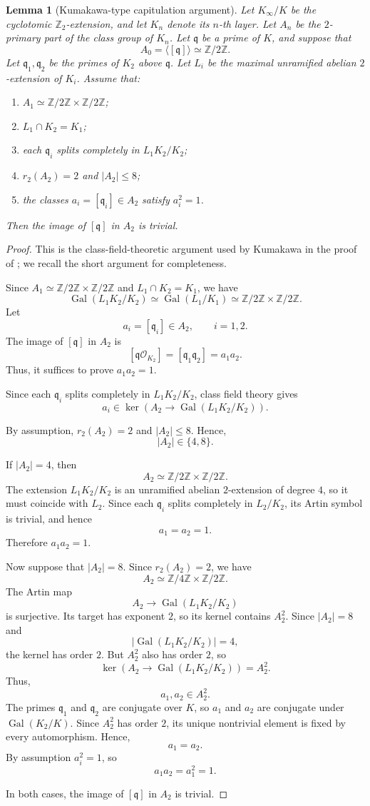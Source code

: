 \documentclass{article}
\numberwithin{equation}{section}
\theoremstyle{plain}  %
\newtheorem{lemma}{Lemma}[section]
\theoremstyle{definition}
\newcommand{\Z}{\mathbb{Z}}
\DeclareMathOperator{\Gal}{Gal}
\newcommand{\fk}{\mathfrak }
\begin{document}
\begin{lemma}[Kumakawa-type capitulation argument]
\label{lem:kumakawa-capitulation}
Let $K_\infty/K$ be the cyclotomic $\Z_2$-extension, and let
$K_n$ denote its $n$-th layer. Let $A_n$ be the $2$-primary part of
the class group of $K_n$. Let $\fk q$ be a prime of $K$, and
suppose that
$$
A_0=\langle[\fk q]\rangle\simeq \Z/2\Z.
$$
Let $\fk q_1,\fk q_2$ be the primes of $K_2$ above
$\fk q$. Let $L_i$ be the maximal unramified abelian
$2$-extension of $K_i$. Assume that:
\begin{enumerate}
    \item $A_1\simeq \Z/2\Z\times \Z/2\Z$;
    \item $L_1\cap K_2=K_1$;
    \item each $\fk q_i$ splits completely in $L_1K_2/K_2$;
    \item $r_2(A_2)=2$ and $|A_2|\le 8$;
    \item the classes $a_i=[\fk q_i]\in A_2$ satisfy $a_i^2=1$.
\end{enumerate}
Then the image of $[\fk q]$ in $A_2$ is trivial.
\end{lemma}

\begin{proof}
This is the class-field-theoretic argument used by Kumakawa in the proof of
\cite[Theorem~2.1.5]{MR4262274}; we recall the short argument for completeness.

Since $A_1\simeq \Z/2\Z\times \Z/2\Z$ and $L_1\cap K_2=K_1$, we have
$$
\Gal(L_1K_2/K_2)\simeq \Gal(L_1/K_1)\simeq \Z/2\Z\times \Z/2\Z.
$$
Let
$$
a_i=[\fk q_i]\in A_2,\qquad i=1,2.
$$
The image of $[\fk q]$ in $A_2$ is
$$
[\fk q\mathcal O_{K_2}]
=
[\fk q_1\fk q_2]
=
a_1a_2.
$$
Thus, it suffices to prove $a_1a_2=1$.

Since each $\fk q_i$ splits completely in $L_1K_2/K_2$, class field
theory gives
$$
a_i\in
\ker\left(A_2\longrightarrow \Gal(L_1K_2/K_2)\right).
$$

By assumption, $r_2(A_2)=2$ and $|A_2|\le 8$. Hence,
$$
|A_2|\in\{4,8\}.
$$

If $|A_2|=4$, then
$$
A_2\simeq \Z/2\Z\times \Z/2\Z.
$$
The extension $L_1K_2/K_2$ is an unramified abelian $2$-extension of
degree $4$, so it must coincide with $L_2$. Since each $\fk q_i$
splits completely in $L_2/K_2$, its Artin symbol is trivial, and hence 
$$
a_1=a_2=1.
$$
Therefore $a_1a_2=1$.

Now suppose that $|A_2|=8$. Since $r_2(A_2)=2$, we have
$$
A_2\simeq \Z/4\Z\times \Z/2\Z.
$$
The Artin map
$$
A_2\longrightarrow \Gal(L_1K_2/K_2)
$$
is surjective. Its target has exponent $2$, so its kernel contains
$A_2^2$. Since $|A_2|=8$ and
$$
|\Gal(L_1K_2/K_2)|=4,
$$
the kernel has order $2$. But $A_2^2$ also has order $2$, so
$$
\ker\left(A_2\longrightarrow \Gal(L_1K_2/K_2)\right)=A_2^2.
$$
Thus,
$$
a_1,a_2\in A_2^2.
$$
The primes $\fk q_1$ and $\fk q_2$ are conjugate over $K$,
so $a_1$ and $a_2$ are conjugate under $\Gal(K_2/K)$. Since $A_2^2$
has order $2$, its unique nontrivial element is fixed by every automorphism.
Hence,
$$
a_1=a_2.
$$
By assumption $a_i^2=1$, so
$$
a_1a_2=a_1^2=1.
$$

In both cases, the image of $[\fk q]$ in $A_2$ is trivial.
\end{proof}
\end{document}
